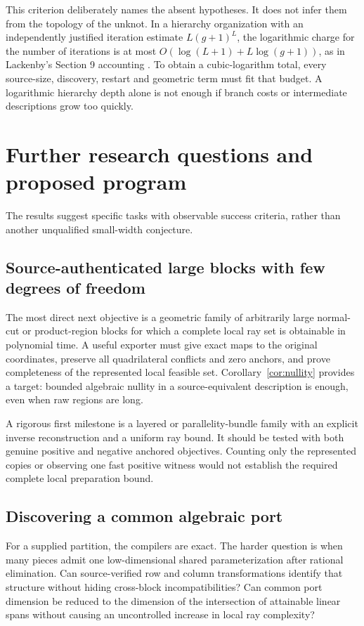 \documentclass[11pt,a4paper]{article}
\theoremstyle{definition}
\theoremstyle{remark}
\begin{document}
This criterion deliberately names the absent hypotheses. It does not infer them from the topology of the unknot. In a hierarchy organization with an independently justified iteration estimate $L(g+1)^L$, the logarithmic charge for the number of iterations is at most $O(\log(L+1)+L\log(g+1))$, as in Lackenby's Section 9 accounting \cite{lack2026}. To obtain a cubic-logarithm total, every source-size, discovery, restart and geometric term must fit that budget. A logarithmic hierarchy depth alone is not enough if branch costs or intermediate descriptions grow too quickly.

\section{Further research questions and proposed program}
\label{sec:future}
The results suggest specific tasks with observable success criteria, rather than another unqualified small-width conjecture.

\subsection{Source-authenticated large blocks with few degrees of freedom}
The most direct next objective is a geometric family of arbitrarily large normal-cut or product-region blocks for which a complete local ray set is obtainable in polynomial time. A useful exporter must give exact maps to the original coordinates, preserve all quadrilateral conflicts and zero anchors, and prove completeness of the represented local feasible set. Corollary~\ref{cor:nullity} provides a target: bounded algebraic nullity in a source-equivalent description is enough, even when raw regions are long.

A rigorous first milestone is a layered or parallelity-bundle family with an explicit inverse reconstruction and a uniform ray bound. It should be tested with both genuine positive and negative anchored objectives. Counting only the represented copies or observing one fast positive witness would not establish the required complete local preparation bound.

\subsection{Discovering a common algebraic port}
For a supplied partition, the compilers are exact. The harder question is when many pieces admit one low-dimensional shared parameterization after rational elimination. Can source-verified row and column transformations identify that structure without hiding cross-block incompatibilities? Can common port dimension be reduced to the dimension of the intersection of attainable linear spans without causing an uncontrolled increase in local ray complexity?
\end{document}
